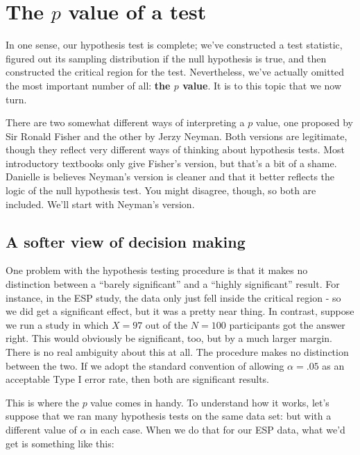 \documentclass[
]{book}
\theoremstyle{definition}
\theoremstyle{definition}
\theoremstyle{definition}
\theoremstyle{definition}
\theoremstyle{remark}
\begin{document}
\hypertarget{pvalue}{%
\section{\texorpdfstring{The \(p\) value of a test}{The p value of a test}}\label{pvalue}}

In one sense, our hypothesis test is complete; we've constructed a test statistic, figured out its sampling distribution if the null hypothesis is true, and then constructed the critical region for the test. Nevertheless, we've actually omitted the most important number of all: \textbf{the \(p\) value}. It is to this topic that we now turn.

There are two somewhat different ways of interpreting a \(p\) value, one proposed by Sir Ronald Fisher and the other by Jerzy Neyman. Both versions are legitimate, though they reflect very different ways of thinking about hypothesis tests. Most introductory textbooks only give Fisher's version, but that's a bit of a shame. Danielle is believes Neyman's version is cleaner and that it better reflects the logic of the null hypothesis test. You might disagree, though, so both are included. We'll start with Neyman's version.

\hypertarget{a-softer-view-of-decision-making}{%
\subsection{A softer view of decision making}\label{a-softer-view-of-decision-making}}

One problem with the hypothesis testing procedure is that it makes no distinction between a ``barely significant'' and a ``highly significant'' result. For instance, in the ESP study, the data only just fell inside the critical region - so we did get a significant effect, but it was a pretty near thing. In contrast, suppose we run a study in which \(X=97\) out of the \(N=100\) participants got the answer right. This would obviously be significant, too, but by a much larger margin. There is no real ambiguity about this at all. The procedure makes no distinction between the two. If we adopt the standard convention of allowing \(\alpha = .05\) as an acceptable Type I error rate, then both are significant results.

This is where the \(p\) value comes in handy. To understand how it works, let's suppose that we ran many hypothesis tests on the same data set: but with a different value of \(\alpha\) in each case. When we do that for our ESP data, what we'd get is something like this:
\end{document}
